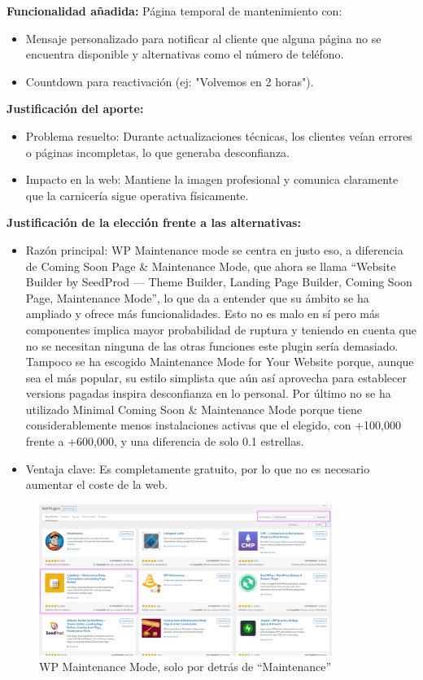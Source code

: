 \documentclass[a4paper]{article}
\begin{document}
\textbf{Funcionalidad añadida:} Página temporal de mantenimiento con:
\begin{itemize}
    \item Mensaje personalizado para notificar al cliente que alguna página no se encuentra disponible y alternativas como el número de teléfono.
    \item Countdown para reactivación (ej: "Volvemos en 2 horas").
\end{itemize}


\textbf{Justificación del aporte:}
\begin{itemize}
    \item Problema resuelto: Durante actualizaciones técnicas, los clientes veían errores o páginas incompletas, lo que generaba desconfianza.
    \item Impacto en la web: Mantiene la imagen profesional y comunica claramente que la carnicería sigue operativa físicamente.
\end{itemize}


\textbf{Justificación de la elección frente a las alternativas:}
\begin{itemize}
    \item Razón principal: WP Maintenance mode se centra en justo eso, a diferencia de Coming Soon Page \& Maintenance Mode, que ahora se llama ``Website Builder by SeedProd — Theme Builder, Landing Page Builder, Coming Soon Page, Maintenance Mode'', lo que da a entender que su ámbito se ha ampliado y ofrece más funcionalidades. Esto no es malo en sí pero más componentes implica mayor probabilidad de ruptura y teniendo en cuenta que no se necesitan ninguna de las otras funciones este plugin sería demasiado. Tampoco se ha escogido Maintenance Mode for Your Website porque, aunque sea el más popular, su estilo simplista que aún así aprovecha para establecer versions pagadas inspira desconfianza en lo personal. Por último no se ha utilizado Minimal Coming Soon \& Maintenance Mode porque tiene considerablemente menos instalaciones activas que el elegido, con +100,000 frente a +600,000, y una diferencia de solo 0.1 estrellas.
    \item Ventaja clave: Es completamente gratuito, por lo que no es necesario aumentar el coste de la web.
\end{itemize}

\begin{figure}[H]
    \centering
    \includegraphics[width=0.85\textwidth]{images/popularidad-maintenance-mode.png}
    \caption{WP Maintenance Mode, solo por detrás de ``Maintenance''}
\end{figure}
\end{document}
